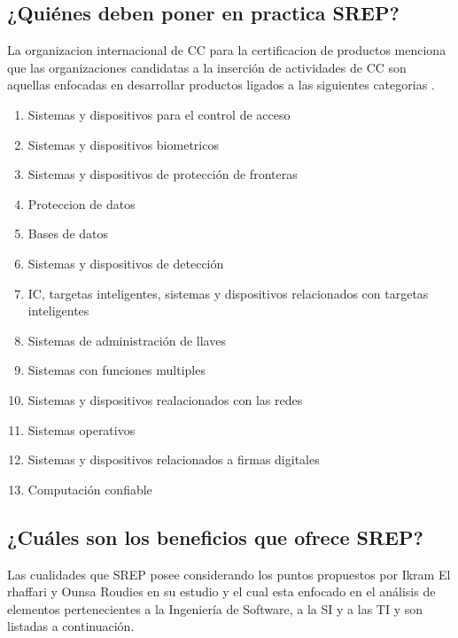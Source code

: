 \documentclass[runningheads,a4paper]{llncs}
\begin{document}
\subsection{¿Quiénes deben poner en practica \gls{SREP}?}
La organizacion internacional de \gls{CC} para la certificacion de productos menciona que las organizaciones candidatas a la inserción de actividades de \gls{CC} son aquellas enfocadas en desarrollar productos ligados a las siguientes categorias \cite{CCStat}.

\begin{enumerate}
	\item Sistemas y dispositivos para el control de acceso
	\item Sistemas y dispositivos biometricos
	\item Sistemas  y dispositivos de protección de fronteras
	\item Proteccion de datos
	\item Bases de datos
	\item Sistemas y dispositivos de detección
	\item \gls{IC}, targetas inteligentes, sistemas y dispositivos relacionados con targetas inteligentes
	\item Sistemas de administración de llaves
	\item Sistemas con funciones multiples
	\item Sistemas y dispositivos realacionados con las redes
	\item Sistemas operativos
	\item Sistemas y dispositivos relacionados a firmas digitales
	\item Computación confiable 
\end{enumerate}

\subsection{¿Cuáles son los beneficios que ofrece \gls{SREP}?}
Las cualidades que \gls{SREP} posee considerando los puntos propuestos por Ikram El rhaffari y Ounsa Roudies en su estudio y el cual esta enfocado en el análisis de elementos pertenecientes a la Ingeniería de \gls{Software}, a la \gls{SI} y a las \gls{TI} y son listadas a continuación.  
\end{document}
